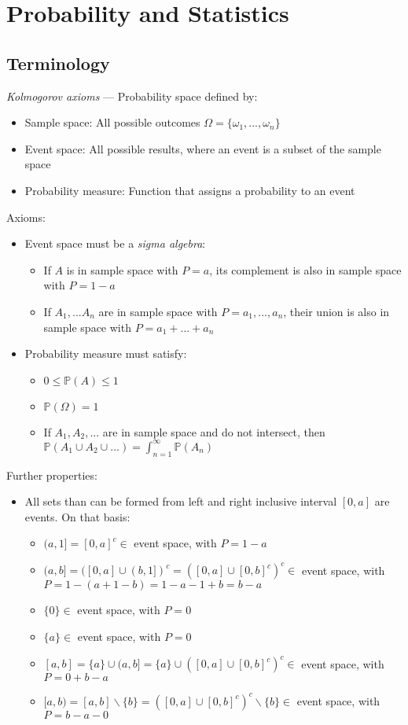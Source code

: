 \section{Probability and Statistics}
\subsection*{Terminology}
\emph{Kolmogorov axioms} --- 
Probability space defined by:
\begin{itemize}
    \item Sample space: All possible outcomes $\Omega = \{\omega_1,...,\omega_n\}$
    \item Event space: All possible results, where an event is a subset of the sample space 
    \item Probability measure: Function that assigns a probability to an event 
\end{itemize}
Axioms:
\begin{itemize}
    \item Event space must be a \emph{sigma algebra}:
    \begin{itemize}
        \item If $A$ is in sample space with $P = a$, its complement is also in sample space with $P = 1-a$
        \item If $A_1,...A_n$ are in sample space with $P=a_1, ..., a_n$, their union is also in sample space with $P = a_1 + ... + a_n$
    \end{itemize}
    \item Probability measure must satisfy:
    \begin{itemize}
        \item $0 \leq \mathbb{P}(A) \leq 1$
        \item $\mathbb{P}({\Omega}) = 1$
        \item If $A_1,A_2,...$ are in sample space and do not intersect, then $\mathbb{P}(A_1 \cup A_2 \cup ...) = \int_{n=1}^{\infty} \mathbb{P}(A_n)$
    \end{itemize}
\end{itemize}
Further properties:
\begin{itemize}
    \item All sets than can be formed from left and right inclusive interval $[0,a]$ are events. On that basis:
    \begin{itemize}
        \item $(a,1] = [0,a]^c \in$ event space, with $P = 1 - a$
        \item $(a,b] = ([0,a] \cup (b,1])^c = ([0,a] \cup [0,b]^c)^c \in$ event space, with $P = 1 - (a + 1 - b) = 1 - a - 1 + b = b - a$
        \item $\{0\} \in$ event space, with $P = 0$
        \item $\{a\} \in$ event space, with $P = 0$
        \item $[a,b] = \{a\} \cup (a,b] = \{a\} \cup ([0,a] \cup [0,b]^c)^c \in$ event space, with $P = 0 + b - a$
        \item $[a,b) = [a,b] \backslash \{b\} = ([0,a] \cup [0,b]^c)^c \backslash \{b\} \in$ event space, with $P = b - a - 0$
    \end{itemize}
\end{itemize}

